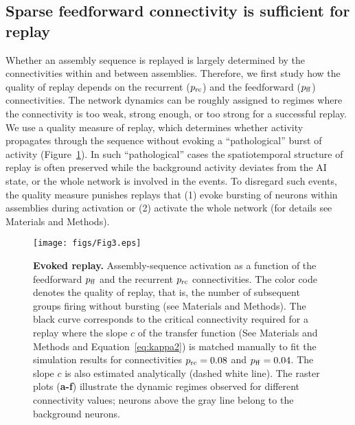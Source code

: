   \subsection{Sparse feedforward connectivity is sufficient for replay}
    Whether an assembly sequence is replayed is largely determined by the
    connectivities within and between assemblies. Therefore, we first study how
    the quality of replay depends on the recurrent ($p_{\rm rc}$) and the
    feedforward ($p_{\rm ff}$) connectivities. The network dynamics can be
    roughly assigned to regimes where the connectivity is too weak, strong
    enough, or too strong for a successful replay. We use a quality measure of
    replay, which determines whether activity propagates through the sequence
    without evoking a ``pathological'' burst of activity (Figure~\ref{fig3}). In
    such ``pathological'' cases the spatiotemporal structure of replay is often
    preserved while the background activity deviates from the AI state, or the
    whole network is involved in the events. To disregard such events, the
    quality measure punishes replays that (1) evoke bursting of neurons within
    assemblies during activation or (2) activate the whole network (for details
    see Materials and Methods). 

    \begin{figure}[!h]
      \texttt{[image: figs/Fig3.eps]}
      \caption{{\bf Evoked replay.}
        Assembly-sequence activation as a function of the feedforward $p_{\rm
        ff}$ and the recurrent $p_{\rm rc}$ connectivities. The color code
        denotes the quality of replay, that is, the number of subsequent groups
        firing without bursting (see Materials and Methods). The black curve
        corresponds to the critical connectivity required for a replay where
        the slope $c$ of the transfer function (See Materials and Methods and
        Equation~\ref{eq:kappa2}) is matched manually to fit the simulation results
        for connectivities $p_{\rm rc}=0.08$ and $p_{\rm ff}=0.04$. The slope
        $c$ is also estimated analytically (dashed white line). The raster
        plots (\textbf{a-f}) illustrate the dynamic regimes observed for
        different connectivity values; neurons above the gray line belong to
        the background neurons.
      }
      \label{fig3}
    \end{figure}

